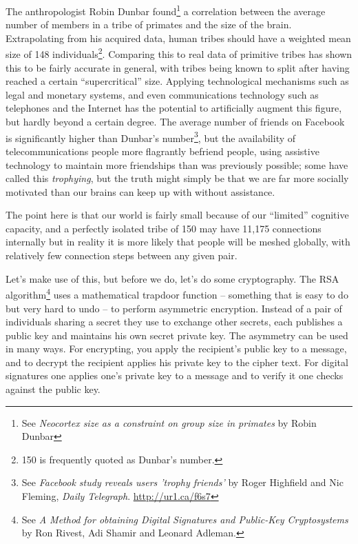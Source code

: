 The anthropologist Robin Dunbar found\footnote{See \textit{Neocortex size as a
constraint on group size in primates} by Robin Dunbar} a correlation between the
average number of members in a tribe of primates and the size of the brain.
Extrapolating from his acquired data, human tribes should have a weighted mean
size of 148 individuals\footnote{150 is frequently quoted as Dunbar's number.}.
Comparing this to real data of primitive tribes has shown this to be fairly
accurate in general, with tribes being known to split after having reached a
certain ``supercritical'' size. Applying technological mechanisms such as legal
and monetary systems, and even communications technology such as telephones and
the Internet has the potential to artif\hbox{}icially augment this
f\hbox{}igure, but hardly beyond a certain degree. The average number of friends
on Facebook is signif\hbox{}icantly higher than Dunbar's number\footnote{See
\textit{Facebook study reveals users 'trophy friends'} by Roger Highf\hbox{}ield
and Nic F\hbox{}leming, \textit{Daily Telegraph}.  \url{http://ur1.ca/f6s7}},
but the availability of telecommunications people more f\hbox{}lagrantly
befriend people, using assistive technology to maintain more friendships than
was previously possible; some have called this \textit{trophying}, but the truth
might simply be that we are far more socially motivated than our brains can keep
up with without assistance.

The point here is that our world is fairly small because of our ``limited''
cognitive capacity, and a perfectly isolated tribe of 150 may have 11,175
connections internally but in reality it is more likely that people will be
meshed globally, with relatively few connection steps between any given pair.

Let's make use of this, but before we do, let's do some cryptography. The RSA
algorithm\footnote{See \textit{A Method for obtaining Digital Signatures and
Public-Key Cryptosystems} by Ron Rivest, Adi Shamir and Leonard Adleman.} uses a
mathematical trapdoor function – something that is easy to do but very hard to
undo – to perform asymmetric encryption. Instead of a pair of individuals
sharing a secret they use to exchange other secrets, each publishes a public key
and maintains his own secret private key. The asymmetry can be used in many
ways. For encrypting, you apply the recipient's public key to a message, and to
decrypt the recipient applies his private key to the cipher text. For digital
signatures one applies one's private key to a message and to verify it one
checks against the public key.

